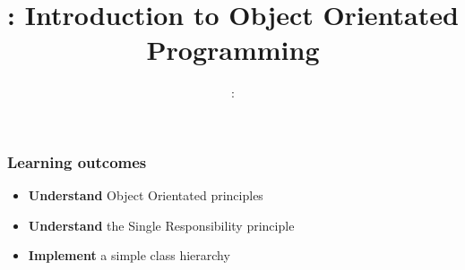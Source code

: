 \usepackage{../../beamerthemeFalmouthGamesAcademy}
\usepackage{multimedia}
\graphicspath{ {../../} }


\usepackage[normalem]{ulem}
\usepackage{wasysym}
\usepackage{pdfpages}

\usetikzlibrary{arrows,automata}




\title{\sessionnumber: Introduction to Object Orientated Programming}
\subtitle{\modulecode: \moduletitle}

\frame{\titlepage} 

\begin{frame}
	\frametitle{Learning outcomes}
	\begin{itemize}
		\item \textbf{Understand} Object Orientated principles
		\item \textbf{Understand} the Single Responsibility principle
		\item \textbf{Implement} a simple class hierarchy
	\end{itemize}
\end{frame}









